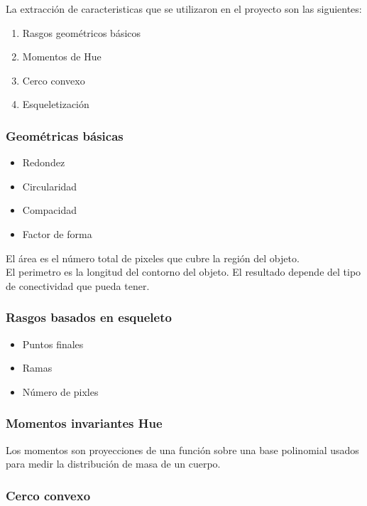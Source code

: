 \documentclass[a4paper, 11pt]{article}
\begin{document}
La extracción de caracteristicas que se utilizaron en el proyecto son las siguientes:

\begin{enumerate}
\item Rasgos geométricos básicos
\item Momentos de Hue
\item Cerco convexo
\item Esqueletización
\end{enumerate}

\subsubsection{Geométricas básicas}

\begin{itemize}
\item Redondez
\item Circularidad
\item Compacidad
\item Factor de forma
\end{itemize}

El área es el número total de pixeles que cubre la región del objeto.\\

El perimetro es la longitud del contorno del objeto. El resultado depende del tipo de conectividad que pueda tener.

\subsubsection{Rasgos basados en esqueleto}

\begin{itemize}
\item Puntos finales
\item Ramas
\item Número de pixles
\end{itemize}

\subsubsection{Momentos invariantes Hue}

Los momentos son proyecciones de una función sobre una base polinomial usados para medir la distribución de masa de un cuerpo.

\subsubsection{Cerco convexo}
\end{document}
